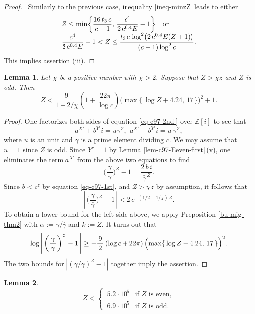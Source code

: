 \documentclass[11pt]{amsart}
\newtheorem{lem}{Lemma}[section]
\numberwithin{equation}{section}
\begin{document}
\begin{proof}
\vspace{0.1cm}{\it Case where $Z \le z.$} \
Similarly to the previous case, inequality \eqref{ineq-minzZ} leads to either
\[ \begin{array}{lllll}
Z \le \min \biggr\{\dfrac{16\,t_3\,c}{c-1}, \,\dfrac{c^4}{2\,{\rm e}^{0.4} E}-1 \biggl\}
\ \ \ \text{or} \\
\dfrac{c^4}{2\,{\rm e}^{0.4}E}-1<Z \le \dfrac{t_3\,c\,\log^2 \bigr(2\,{\rm e}^{0.4}E(Z+1)\big)}{(c-1)\log^2 c}.
\end{array} \]
This implies assertion (iii).
\end{proof}

\begin{lem} \label{complex-baker}
Let $\chi$ be a positive number with $\chi>2.$
Suppose that $Z>\chi z$ and $Z$ is odd.
Then
\[
Z<\frac{9}{1-2/\chi} \left(1+\frac{22\pi}{\log c}\right) \Bigr(\max \{ \,\log Z+4.24,\,17\, \} \Bigr)^2+1.
\]
\end{lem}

\begin{proof}
One factorizes both sides of equation \eqref{eq-c97-2nd'} over $\mathbb Z[i]$ to see that
\[
a^{X'}+b^{Y'} i=u \gamma^Z, \ \ a^{X'}-b^{Y'} i=\bar{u}\,{\bar{\gamma}}^{Z},
\]
where $u$ is an unit and $\gamma$ is a prime element dividing $c$. 
We may assume that $u=1$ since $Z$ is odd.
Since $Y'=1$ by Lemma \ref{lem-c97-Eeven-first}\,(v), one eliminates the term $a^{X'}$ from the above two equations to find
\[
\biggl(\frac{\,\gamma\,}{\bar{\gamma}}\biggr)^Z-1=\frac{2\,b\,i}{{\bar{\gamma}}^{\,Z}}.
\]
Since $b<c^z$ by equation \eqref{eq-c97-1st}, and $Z>\chi z$ by assumption, it follows that
\[
\left|\,\biggl(\frac{\,\gamma\,}{\bar{\gamma}}\biggr)^Z-1\, \right| < 2\,c^{-(1/2-1/\chi)\,Z}.
\]
To obtain a lower bound for the left side above, we apply Proposition \ref{bu-mig-thm2} with $\alpha:=\gamma/\bar{\gamma}$ and $k:=Z$. 
It turns out that
\[
\log \left|\,\biggl(\frac{\,\gamma\,}{\bar{\gamma}}\biggr)^Z-1 \,\right| \ge -\frac{\,9\,}{2}\,(\log c+22\pi)\,\Bigl( \max \{ \,\log Z+4.24,\,17\,\}\Bigl)^2.
\]
The two bounds for $|(\gamma/\bar{\gamma})^Z-1|$ together imply the assertion.
\end{proof}

\begin{lem} \label{Z-bound-sharp-thm2}
\[ Z< \begin{cases}
\, 5.2 \cdot 10^5 
& \text{if $Z$ is even}, \\
\, 6.9 \cdot 10^5 
& \text{if $Z$ is odd}.
\end{cases}\]
\end{lem}
\end{document}
